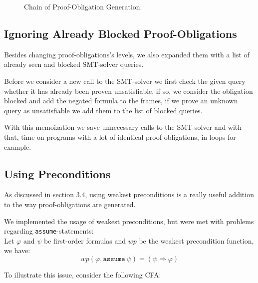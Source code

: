 \documentclass[11pt, a4paper, BCOR=10mm, ngerman]{scrbook}
\begin{document}
\begin{figure}[H]
\centering
\resizebox{\textwidth}{!}{}
\caption{Chain of Proof-Obligation Generation.}
\label{fig:the_nice_figure}
\end{figure}
 

\subsection{Ignoring Already Blocked Proof-Obligations}
Besides changing proof-obligations's levels, we also expanded them with a list of already seen and blocked SMT-solver queries. \par Before we consider a new call to the SMT-solver we first check the given query whether it has already been proven unsatisfiable, if so, we consider the obligation blocked and add the negated formula to the frames, if we prove an unknown query as unsatisfiable we add them to the list of blocked queries. \par
With this memoization we save unnecessary calls to the SMT-solver and with that, time on programs with a lot of identical proof-obligations, in loops for example.

\subsection{Using Preconditions}
As discussed in section 3.4, using weakest preconditions is a really useful addition to the way proof-obligations are generated. \par
We implemented the usage of weakest preconditions, but were met with problems regarding \texttt{assume}-statements: \\
Let $\varphi$ and $\psi$ be first-order formulas and $wp$ be the weakest precondition function, we have: 
\begin{equation}
	wp(\varphi, \texttt{assume}\ \psi) = (\psi \Rightarrow \varphi)
\end{equation}

To illustrate this issue, consider the following CFA: \\
\end{document}
